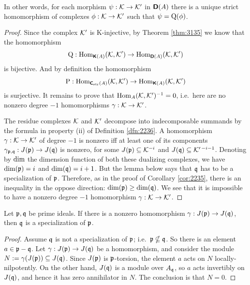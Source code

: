 In other words, for each morphism $\psi : \mathcal{K} \to \mathcal{K}'$ in 
$\boldsymbol{\mathsf{D}}(A)$ there is a unique strict homomorphism of complexes 
$\phi : \mathcal{K} \to \mathcal{K}'$ such that $\psi = \operatorname{Q}(\phi)$. 

\begin{proof}
Since the complex $\mathcal{K}'$ is K-injective, by Theorem \ref{thm:3135}
we know that the homomorphism 
\[ \operatorname{Q} : \operatorname{Hom}_{\boldsymbol{\mathsf{K}}(A)}(\mathcal{K}, \mathcal{K}') \to 
\operatorname{Hom}_{\boldsymbol{\mathsf{D}}(A)}(\mathcal{K}, \mathcal{K}') \]
is bijective. And by definition the homomorphism 
\[ \operatorname{P} : \operatorname{Hom}_{\boldsymbol{\mathsf{C}}_{\mathrm{str}}(A)}(\mathcal{K}, \mathcal{K}') \to 
\operatorname{Hom}_{\boldsymbol{\mathsf{K}}(A)}(\mathcal{K}, \mathcal{K}') \]
is surjective. It remains to prove that 
$\operatorname{Hom}_{A}(\mathcal{K}, \mathcal{K}')^{-1} = 0$,
i.e.\ here are no nonzero degree $-1$ homomorphisms $\gamma : \mathcal{K} \to \mathcal{K}'$. 

The residue complexes $\mathcal{K}$ and $\mathcal{K}'$ decompose into indecomposable summands 
by the formula in property (ii) of Definition \ref{dfn:2236}. 
A homomorphism $\gamma : \mathcal{K} \to \mathcal{K}'$ of degree $-1$ 
is nonzero iff at least one of its components 
$\gamma_{\mathfrak{p}, \mathfrak{q}} : J(\mathfrak{p}) \to J(\mathfrak{q})$ 
is nonzero, for some $J(\mathfrak{p}) \subseteq \mathcal{K}^{-i}$ and $J(\mathfrak{q}) \subseteq \mathcal{K}'^{\, -i - 1}$.
Denoting by $\operatorname{dim}$ the dimension function of both these dualizing 
complexes, we have $\operatorname{dim}(\mathfrak{p}) = i$ and $\operatorname{dim}(\mathfrak{q}) = i + 1$. 
But the lemma below says that $\mathfrak{q}$ has to be a specialization of $\mathfrak{p}$. 
Therefore, as in the proof of Corollary \ref{cor:2235}, there is an inequality 
in the oppose direction:  
$\operatorname{dim}(\mathfrak{p}) \geq \operatorname{dim}(\mathfrak{q})$. 
We see that it is impossible to have a  nonzero degree $-1$ 
homomorphism $\gamma : \mathcal{K} \to \mathcal{K}'$. 
\end{proof}

\begin{lem} \label{lem:2240}
Let $\mathfrak{p}, \mathfrak{q}$ be prime ideals. If there is a nonzero homomorphism 
$\gamma : J(\mathfrak{p}) \to J(\mathfrak{q})$, then 
$\mathfrak{q}$ is a specialization of $\mathfrak{p}$. 
\end{lem}

\begin{proof}
Assume $\mathfrak{q}$ is not a specialization of $\mathfrak{p}$; i.e.\ 
$\mathfrak{p} \nsubseteq \mathfrak{q}$. So there is an element $a \in \mathfrak{p} - \mathfrak{q}$. 
Let $\gamma : J(\mathfrak{p}) \to J(\mathfrak{q})$ be a homomorphism, and consider the module 
$N := \gamma(J(\mathfrak{p})) \subseteq J(\mathfrak{q})$. Since $J(\mathfrak{p})$ is $\mathfrak{p}$-torsion, the element $a$ 
acts on $N$ locally-nilpotently. On the other hand, $J(\mathfrak{q})$ is a module over 
$A_{\mathfrak{q}}$, so $a$ acts invertibly on $J(\mathfrak{q})$, and hence it has zero annihilator 
in $N$. The conclusion is that $N = 0$. 
\end{proof}

